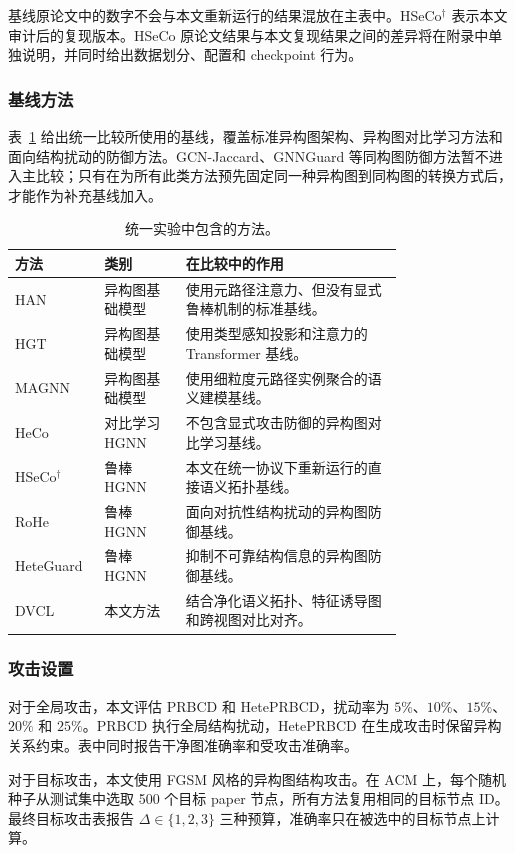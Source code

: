 基线原论文中的数字不会与本文重新运行的结果混放在主表中。HSeCo$^{\dagger}$ 表示本文审计后的复现版本。HSeCo 原论文结果与本文复现结果之间的差异将在附录中单独说明，并同时给出数据划分、配置和 checkpoint 行为。

\subsubsection{基线方法}

表~\ref{tab:baselines_zh} 给出统一比较所使用的基线，覆盖标准异构图架构、异构图对比学习方法和面向结构扰动的防御方法。GCN-Jaccard、GNNGuard 等同构图防御方法暂不进入主比较；只有在为所有此类方法预先固定同一种异构图到同构图的转换方式后，才能作为补充基线加入。

\begin{table}[htbp]
\centering
\small
\caption{统一实验中包含的方法。}
\label{tab:baselines_zh}
\begin{tabular}{lp{0.21\linewidth}p{0.56\linewidth}}
\toprule
方法 & 类别 & 在比较中的作用 \\
\midrule
HAN & 异构图基础模型 & 使用元路径注意力、但没有显式鲁棒机制的标准基线。 \\
HGT & 异构图基础模型 & 使用类型感知投影和注意力的 Transformer 基线。 \\
MAGNN & 异构图基础模型 & 使用细粒度元路径实例聚合的语义建模基线。 \\
HeCo & 对比学习 HGNN & 不包含显式攻击防御的异构图对比学习基线。 \\
HSeCo$^{\dagger}$ & 鲁棒 HGNN & 本文在统一协议下重新运行的直接语义拓扑基线。 \\
RoHe & 鲁棒 HGNN & 面向对抗性结构扰动的异构图防御基线。 \\
HeteGuard & 鲁棒 HGNN & 抑制不可靠结构信息的异构图防御基线。 \\
DVCL & 本文方法 & 结合净化语义拓扑、特征诱导图和跨视图对比对齐。 \\
\bottomrule
\end{tabular}
\end{table}

\subsubsection{攻击设置}

对于全局攻击，本文评估 PRBCD 和 HetePRBCD，扰动率为 $5\%$、$10\%$、$15\%$、$20\%$ 和 $25\%$。PRBCD 执行全局结构扰动，HetePRBCD 在生成攻击时保留异构关系约束。表中同时报告干净图准确率和受攻击准确率。

对于目标攻击，本文使用 FGSM 风格的异构图结构攻击。在 ACM 上，每个随机种子从测试集中选取 500 个目标 paper 节点，所有方法复用相同的目标节点 ID。最终目标攻击表报告 $\Delta\in\{1,2,3\}$ 三种预算，准确率只在被选中的目标节点上计算。

